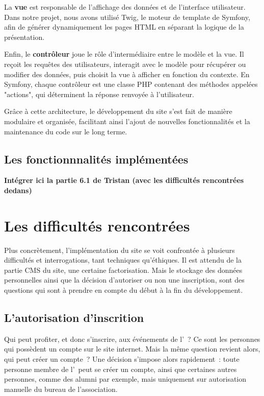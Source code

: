 La \textbf{vue} est responsable de l'affichage des données et de l'interface utilisateur. Dans notre projet, nous avons utilisé Twig, le moteur de template de Symfony, afin de générer dynamiquement les pages HTML en séparant la logique de la présentation.

Enfin, le \textbf{contrôleur} joue le rôle d’intermédiaire entre le modèle et la vue. Il reçoit les requêtes des utilisateurs, interagit avec le modèle pour récupérer ou modifier des données, puis choisit la vue à afficher en fonction du contexte. En Symfony, chaque contrôleur est une classe PHP contenant des méthodes appelées "actions", qui déterminent la réponse renvoyée à l’utilisateur.

Grâce à cette architecture, le développement du site s’est fait de manière modulaire et organisée, facilitant ainsi l’ajout de nouvelles fonctionnalités et la maintenance du code sur le long terme.


\subsection{Les fonctionnnalités implémentées}

\textbf{Intégrer ici la partie 6.1 de Tristan (avec les difficultés rencontrées dedans)}








\section{Les difficultés rencontrées}
\label{sec:difficultes}

Plus concrètement, l'implémentation du site se voit confrontée à plusieurs difficultés et interrogations, tant techniques qu'éthiques. Il est attendu de la partie CMS du site, une certaine factorisation. Mais le stockage des données personnelles ainsi que la décision d'autoriser ou non une inscription, sont des questions qui sont à prendre en compte du début à la fin du développement.

\subsection{L'autorisation d'inscrition}
\label{subsec:autorisation-inscription}

Qui peut profiter, et donc s'inscrire, aux événements de l'\ofni~? Ce sont les personnes qui possèdent un compte sur le site internet. Mais la même question revient alors, qui peut créer un compte~? Une décision s'impose alors rapidement~: toute personne membre de l'\univ\ peut se créer un compte, ainsi que certaines autres personnes, comme des alumni par exemple, mais uniquement sur autorisation manuelle du bureau de l'association.

